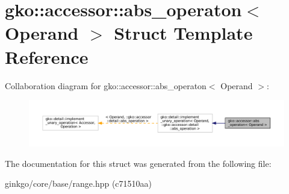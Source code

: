 \hypertarget{structgko_1_1accessor_1_1abs__operaton}{}\section{gko\+:\+:accessor\+:\+:abs\+\_\+operaton$<$ Operand $>$ Struct Template Reference}
\label{structgko_1_1accessor_1_1abs__operaton}


Collaboration diagram for gko\+:\+:accessor\+:\+:abs\+\_\+operaton$<$ Operand $>$\+:
\nopagebreak
\begin{figure}[H]
\begin{center}
\leavevmode
\includegraphics[width=350pt]{structgko_1_1accessor_1_1abs__operaton__coll__graph}
\end{center}
\end{figure}


The documentation for this struct was generated from the following file\+:\begin{DoxyCompactItemize}
\item 
ginkgo/core/base/range.\+hpp (c71510aa)\end{DoxyCompactItemize}

